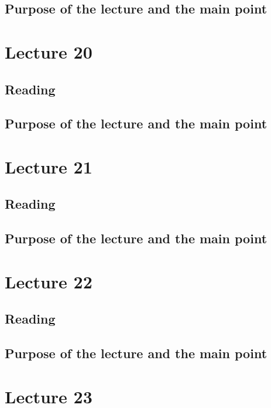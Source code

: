 \subsection{Purpose of the lecture and the main point}

\section{Lecture 20}


\subsection{Reading}


\subsection{Purpose of the lecture and the main point}

\section{Lecture 21}


\subsection{Reading}


\subsection{Purpose of the lecture and the main point}



\section{Lecture 22}




\subsection{Reading}


\subsection{Purpose of the lecture and the main point}

\section{Lecture 23}



